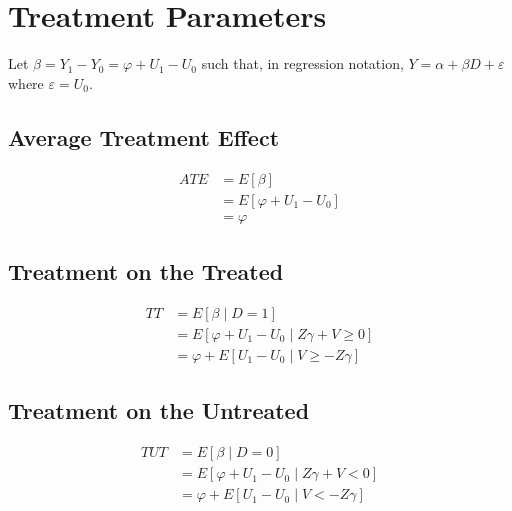 \documentclass[9pt,twocolumn,twoside,]{pnas-new}
\begin{document}
\hypertarget{treatment-parameters}{%
\section{Treatment Parameters}\label{treatment-parameters}}

Let \(\beta = Y_1 - Y_0 = \varphi + U_1 - U_0\) such that, in regression
notation, \(Y = \alpha + \beta D + \varepsilon\) where
\(\varepsilon = U_0\).

\hypertarget{average-treatment-effect}{%
\subsection*{Average Treatment Effect}\label{average-treatment-effect}}

\begin{align*}
ATE &= E \left[ \beta \right] \\
&= E \left[ \varphi + U_1 - U_0 \right] \\
&= \varphi
\end{align*}

\hypertarget{treatment-on-the-treated}{%
\subsection*{Treatment on the Treated}\label{treatment-on-the-treated}}

\begin{align*}
TT &= E \left[ \beta \mid D = 1 \right] \\
&= E \left[ \varphi + U_1 - U_0 \mid Z \gamma + V \geq 0 \right] \\
&= \varphi + E \left[ U_1 - U_0 \mid V \geq - Z \gamma \right]
\end{align*}

\hypertarget{treatment-on-the-untreated}{%
\subsection*{Treatment on the
Untreated}\label{treatment-on-the-untreated}}

\begin{align*}
TUT &= E \left[ \beta \mid D = 0 \right] \\
&= E \left[ \varphi + U_1 - U_0 \mid Z \gamma + V < 0 \right] \\
&= \varphi + E \left[ U_1 - U_0 \mid V < - Z \gamma \right]
\end{align*}
\end{document}

